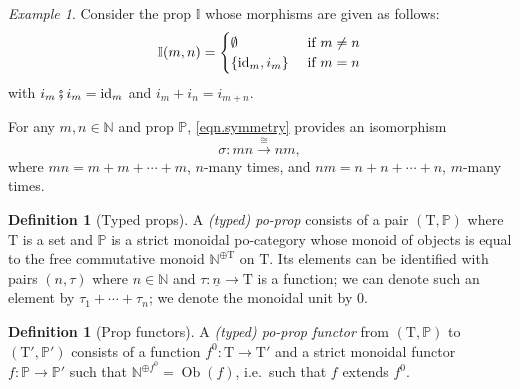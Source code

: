 \documentclass[11pt, oneside, article]{memoir}
\theoremstyle{plain}
\theoremstyle{definition}
\newtheorem{definition}[theorem]{Definition}
\theoremstyle{remark}
\newtheorem{example}[theorem]{Example}
\newcommand{\Set}[1]{\mathrm{#1}}%
\newcommand{\ord}[1]{\underline{#1}}%
\newcommand{\ccat}[1]{\mathbb{#1}}%
\newcommand{\funn}[1]{\mathrm{#1}}%
\DeclareMathOperator{\ob}{\Set{Ob}}
\newcommand{\tn}[1]{\textnormal{#1}}
\newcommand{\nn}{\mathbb{N}}
\newcommand{\pp}{\mathbb{P}}
\newcommand{\id}{\funn{id}}
\newcommand{\cp}{\mathbin{\fatsemi}}
\newcommand{\To}[1]{\xrightarrow{#1}}
\newcommand{\types}{\Set{T}}
\begin{document}
\begin{example}\label{ex.involutions}
Consider the prop $\ccat{I}$ whose morphisms are given as follows:
\[
  \ccat{I}(m,n)=
  \begin{cases}
  	\emptyset&\tn{ if }m\neq n\\
		\{\id_m, i_m\}&\tn{ if }m=n
  \end{cases}
 \]
 with $i_m\cp i_m=\id_m$ and $i_m+i_n=i_{m+n}$. 
\end{example}

For any $m,n\in\nn$ and prop $\pp$, \cref{eqn.symmetry} provides an isomorphism
\[\sigma\colon mn\To{\cong}nm,\]
where $mn=m+m+\cdots+m$, $n$-many times, and $nm=n+n+\cdots+n$, $m$-many times.

\begin{definition}[Typed props]
A \emph{(typed) po-prop} consists of a pair $(\types,\pp)$ where $\types$ is a set and $\pp$ is a strict monoidal po-category whose monoid of objects is equal to the free commutative monoid $\nn^{\oplus\types}$ on $\types$. Its elements can be identified with pairs $(n,\tau)$ where $n\in\nn$ and $\tau\colon\ord{n}\to\types$ is a function; we can denote such an element by $\tau_1+\cdots+\tau_n$; we denote the monoidal unit by $0$.
\end{definition}

\begin{definition}[Prop functors]
A \emph{(typed) po-prop functor} from $(\types,\pp)$ to $(\types',\pp')$ consists of a function $f^0\colon\types\to\types'$ and a strict monoidal functor $f\colon\pp\to\pp'$ such that $\nn^{\oplus f^0}=\ob(f)$, i.e.\ such that $f$ extends $f^0$.
\end{definition}
\end{document}
